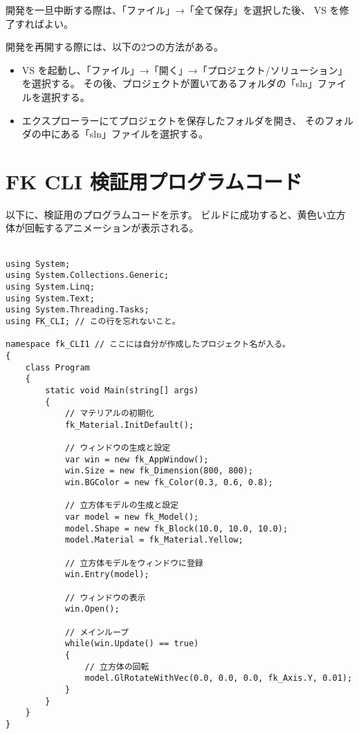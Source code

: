\documentclass[a4paper]{jsarticle}
\begin{document}
開発を一旦中断する際は、「ファイル」→「全て保存」を選択した後、
VS を修了すればよい。

開発を再開する際には、以下の2つの方法がある。

\begin{itemize}
 \item VS を起動し、「ファイル」→「開く」→「プロジェクト/ソリューション」を選択する。
	その後、プロジェクトが置いてあるフォルダの「sln」ファイルを選択する。

 \item エクスプローラーにてプロジェクトを保存したフォルダを開き、
	そのフォルダの中にある「sln」ファイルを選択する。
\end{itemize}

\section{FK CLI 検証用プログラムコード}
以下に、検証用のプログラムコードを示す。
ビルドに成功すると、黄色い立方体が回転するアニメーションが表示される。\\ ~
\begin{breakbox}
\begin{small}
\begin{verbatim}
using System;
using System.Collections.Generic;
using System.Linq;
using System.Text;
using System.Threading.Tasks;
using FK_CLI; // この行を忘れないこと。

namespace fk_CLI1 // ここには自分が作成したプロジェクト名が入る。
{
    class Program
    {
        static void Main(string[] args)
        {
            // マテリアルの初期化
            fk_Material.InitDefault();

            // ウィンドウの生成と設定
            var win = new fk_AppWindow();
            win.Size = new fk_Dimension(800, 800);
            win.BGColor = new fk_Color(0.3, 0.6, 0.8);

            // 立方体モデルの生成と設定
            var model = new fk_Model();
            model.Shape = new fk_Block(10.0, 10.0, 10.0);
            model.Material = fk_Material.Yellow;

            // 立方体モデルをウィンドウに登録
            win.Entry(model);

            // ウィンドウの表示
            win.Open();

            // メインループ
            while(win.Update() == true)
            {
                // 立方体の回転
                model.GlRotateWithVec(0.0, 0.0, 0.0, fk_Axis.Y, 0.01);
            }
        }
    }
}
\end{verbatim}
\end{small}
\end{breakbox}
\end{document}
